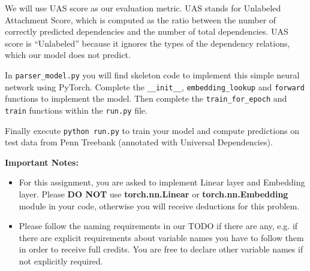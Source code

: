 \begin{parts}
    We will use UAS score as our evaluation metric. UAS stands for Unlabeled Attachment Score, which is computed as the ratio between the number of correctly predicted dependencies and the number of total dependencies. UAS score is ``Unlabeled'' because it ignores the types of the dependency relations, which our model does not predict.\newline

    In \texttt{parser\_model.py} you will find skeleton code to implement this simple neural network using PyTorch. Complete the \texttt{\_\_init\_\_}, \texttt{embedding\_lookup} and \texttt{forward} functions to implement the model. Then complete the \texttt{train\_for\_epoch} and \texttt{train} functions within the \texttt{run.py} file.

    Finally execute \texttt{python run.py} to train your model and compute predictions
    on test data from Penn Treebank (annotated with Universal Dependencies).

    \textbf{Important Notes:}
    \begin{itemize}
        \item For this assignment, you are asked to implement Linear layer and Embedding layer. Please \textbf{DO NOT} use \textbf{torch.nn.Linear} or  \textbf{torch.nn.Embedding} module in your code, otherwise you will receive deductions for this problem.
        \item Please follow the naming requirements in our TODO if there are any, e.g. if there are explicit requirements about variable names you have to follow them in order to receive full credits. You are free to declare other variable names if not explicitly required.
    \end{itemize}


\end{parts}
